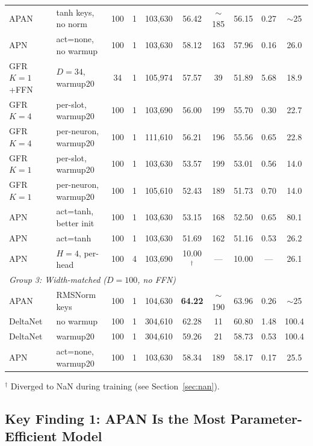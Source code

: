 \documentclass[11pt,a4paper]{article}
\begin{document}
\begin{table}[h]
{\begin{tabular}{llcccccccc}
APAN & tanh keys, no norm & 100 & 1 & 103,630 & 56.42 & $\sim$185 & 56.15 & 0.27 & $\sim$25 \\
APN & act=none, no warmup & 100 & 1 & 103,630 & 58.12 & 163 & 57.96 & 0.16 & 26.0 \\
GFR $K{=}1$+FFN & $D{=}34$, warmup20 & 34 & 1 & 105,974 & 57.57 & 39 & 51.89 & 5.68 & 18.9 \\
GFR $K{=}4$ & per-slot, warmup20 & 100 & 1 & 103,690 & 56.00 & 199 & 55.70 & 0.30 & 22.7 \\
GFR $K{=}4$ & per-neuron, warmup20 & 100 & 1 & 111,610 & 56.21 & 196 & 55.56 & 0.65 & 22.8 \\
GFR $K{=}1$ & per-slot, warmup20 & 100 & 1 & 103,630 & 53.57 & 199 & 53.01 & 0.56 & 14.0 \\
GFR $K{=}1$ & per-neuron, warmup20 & 100 & 1 & 105,610 & 52.43 & 189 & 51.73 & 0.70 & 14.0 \\
APN & act=tanh, better init & 100 & 1 & 103,630 & 53.15 & 168 & 52.50 & 0.65 & 80.1 \\
APN & act=tanh & 100 & 1 & 103,630 & 51.69 & 162 & 51.16 & 0.53 & 26.2 \\
APN & $H{=}4$, per-head & 100 & 4 & 103,690 & 10.00$^\dagger$ & --- & 10.00 & --- & 26.1 \\
\midrule
\multicolumn{10}{l}{\textit{Group 3: Width-matched ($D{=}100$, no FFN)}} \\
\midrule
APAN & RMSNorm keys & 100 & 1 & 104,630 & \textbf{64.22} & $\sim$190 & 63.96 & 0.26 & $\sim$25 \\
DeltaNet & no warmup & 100 & 1 & 304,610 & 62.28 & 11 & 60.80 & 1.48 & 100.4 \\
DeltaNet & warmup20 & 100 & 1 & 304,610 & 59.26 & 21 & 58.73 & 0.53 & 100.4 \\
APN & act=none, warmup20 & 100 & 1 & 103,630 & 58.34 & 189 & 58.17 & 0.17 & 25.5 \\
\bottomrule
\end{tabular}%
}

\smallskip
{\footnotesize ${}^\dagger$ Diverged to NaN during training (see Section~\ref{sec:nan}).}
\end{table}

\subsection{Key Finding 1: APAN Is the Most Parameter-Efficient Model}
\end{document}
